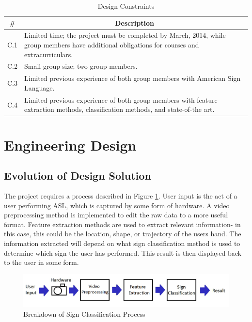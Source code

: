 \documentclass[12pt]{article}
\begin{document}
\begin{table}[h]
\centering
\caption{Design Constraints}
\label{constrain}
\begin{tabular}{|l|p{15cm}|}
\hline
\multicolumn{1}{|c}{\textbf{\#}} & \multicolumn{1}{|c|}{\textbf{Description}} \\ \hline
C.1 & Limited time; the project must be completed by March, 2014, while group members have additional obligations for courses and extracurriculars. \\ \hline
C.2 & Small group size; two group members. \\ \hline
C.3 & Limited previous experience of both group members with American Sign Language. \\ \hline
C.4 & Limited previous experience of both group members with feature extraction methods, classification methods, and state-of-the art. \\ \hline
\end{tabular}
\end{table}


\newpage
\section{Engineering Design}
\subsection{Evolution of Design Solution}
The project requires a process described in Figure \ref{process}.  User input is the act of a user performing ASL, which is captured by some form of hardware. A video preprocessing method is implemented to edit the raw data to a more useful format. Feature extraction methods are used to extract relevant information- in this case, this could be the location, shape, or trajectory of the users hand. The information extracted will depend on what sign classification method is used to determine which sign the user has performed. This result is then displayed back to the user in some form.

\begin{figure}[h!]
  \centering
  \includegraphics[scale=1]{Process.png}
  \caption{Breakdown of Sign Classification Process}
  \label{process}
\end{figure}
\end{document}
